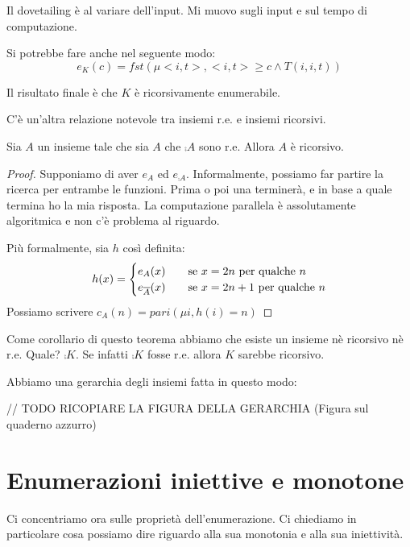 Il dovetailing è al variare dell'input. Mi muovo sugli input e sul tempo di computazione.

Si potrebbe fare anche nel seguente modo:
\begin{equation*}
    e_{K}(c) = fst(\mu <i,t>, <i,t> \geq c \land T(i,i,t))
\end{equation*}

Il risultato finale è che $K$ è ricorsivamente enumerabile.

C'è un'altra relazione notevole tra insiemi r.e. e insiemi ricorsivi.

\begin{thm}
    Sia $A$ un insieme tale che sia $A$ che $\comp{A}$ sono r.e. Allora $A$ è ricorsivo.
\end{thm}
\begin{proof}
    Supponiamo di aver $e_{A}$ ed $e_{\comp{A}}$. Informalmente, possiamo far partire la ricerca per
    entrambe le funzioni. Prima o poi una terminerà, e in base a quale termina ho la mia risposta. La
    computazione parallela è assolutamente algoritmica e non c'è problema al riguardo.

    Più formalmente, sia $h$ così definita:
    \begin{equation*}
        h(x) =
        \begin{cases}
            e_{A}(x) \quad &\text{se $x = 2n$ per qualche $n$} \\
            e_{\overline{A}}(x) \quad &\text{se $x = 2n+1$ per qualche $n$} \\
        \end{cases}
    \end{equation*}
    Possiamo scrivere $c_{A}(n) = \textit{pari}(\mu i, h(i) = n)$
\end{proof}

Come corollario di questo teorema abbiamo che esiste un insieme nè ricorsivo nè r.e. Quale?
$\comp{K}$. Se infatti $\comp{K}$ fosse r.e. allora $K$ sarebbe ricorsivo.

Abbiamo una gerarchia degli insiemi fatta in questo modo: 

// TODO RICOPIARE LA FIGURA DELLA GERARCHIA
(Figura sul quaderno azzurro)

\section{Enumerazioni iniettive e monotone}

Ci concentriamo ora sulle proprietà dell'enumerazione. Ci chiediamo in particolare cosa possiamo
dire riguardo alla sua monotonia e alla sua iniettività.

